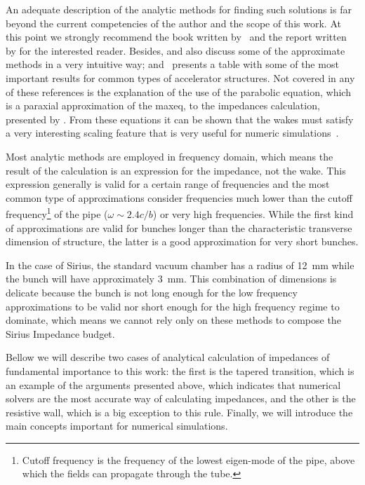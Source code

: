 	An adequate description of the analytic methods for finding such solutions is far beyond the current competencies of the author and the scope of this work. At this point we strongly recommend the book written by~ and the report written by  for the interested reader. Besides,  and  also discuss some of the approximate methods in a very intuitive way; and~ presents a table with some of the most important results for common types of accelerator structures. Not covered in any of these references is the explanation of the use of the parabolic equation, which is a paraxial approximation of the \gls{maxeq}, to the impedances calculation, presented by . From these equations it can be shown that the wakes must satisfy a very interesting scaling feature that is very useful for numeric simulations~\cite{stupakov2011}.

    Most analytic methods are employed in frequency domain, which means the result of the calculation is an expression for the impedance, not the wake. This expression generally is valid for a certain range of frequencies and the most common type of approximations consider frequencies much lower than the cutoff frequency\footnote{Cutoff frequency is the frequency of the lowest eigen-mode of the pipe, above which the fields can propagate through the tube.} of the pipe ($\omega\sim2.4c/b$) or very high frequencies. While the first kind of approximations are valid for bunches longer than the characteristic transverse dimension of structure, the latter is a good approximation for very short bunches.

    In the case of Sirius, the standard vacuum chamber has a radius of \SI{12}{\milli\meter} while the bunch will have approximately \SI{3}{\milli\meter}. This combination of dimensions is delicate because the bunch is not long enough for the low frequency approximations to be valid nor short enough for the high frequency regime to dominate, which means we cannot rely only on these methods to compose the Sirius Impedance budget.

    Bellow we will describe two cases of analytical calculation of impedances of fundamental importance to this work: the first is the tapered transition, which is an example of the arguments presented above, which indicates that numerical solvers are the most accurate way of calculating impedances, and the other is the resistive wall, which is a big exception to this rule. Finally, we will introduce the main concepts important for numerical simulations.

